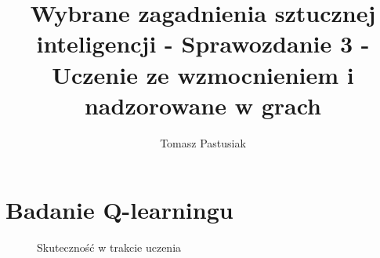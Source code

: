 \documentclass{article}
\title{Wybrane zagadnienia sztucznej inteligencji - Sprawozdanie 3 - Uczenie ze wzmocnieniem i nadzorowane w grach}
\author{Tomasz Pastusiak \And{Leszek Kawecki}}
\begin{document}

\maketitle


\section{Badanie Q-learningu}

\begin{figure}[H]
  \centering
  \caption{Skuteczność w trakcie uczenia}
  \label{fig:L02G01_qlearning}
\end{figure}
\end{document}
